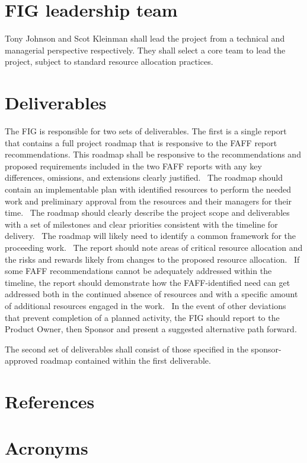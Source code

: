\documentclass[SE,authoryear]{lsstdoc}
\begin{document}
\section{FIG leadership team}
Tony Johnson and Scot Kleinman shall lead the project from a technical
and managerial perspective respectively. They shall select a core team
to lead the project, subject to standard resource allocation practices. 


\section{Deliverables}
The FIG is responsible for two sets of deliverables. The first is a
single report that contains a full project roadmap that is responsive to
the FAFF report recommendations. This roadmap shall be responsive to the
recommendations and proposed requirements included in the two FAFF reports
with any key differences, omissions, and extensions clearly justified. 
The roadmap should contain an implementable plan with identified resources
to perform the needed work and preliminary approval from the resources
and their managers for their time.  The roadmap should clearly describe
the project scope and deliverables with a set of milestones and clear
priorities consistent with the timeline for delivery.  The roadmap will
likely need to identify a common framework for the proceeding work.  The
report should note areas of critical resource allocation and the risks
and rewards likely from changes to the proposed resource allocation. 
If some FAFF recommendations cannot be adequately addressed within the
timeline, the report should demonstrate how the FAFF-identified need
can get addressed both in the continued absence of resources and with
a specific amount of additional resources engaged in the work.  In the
event of other deviations that prevent completion of a planned activity,
the FIG should report to the Product Owner, then Sponsor and present a
suggested alternative path forward.


The second set of deliverables shall consist of those specified in the
sponsor-approved roadmap contained within the first deliverable. 


\appendix
\section{References} \label{sec:bib}
\renewcommand{\refname}{} %


\section{Acronyms} \label{sec:acronyms}

\end{document}
